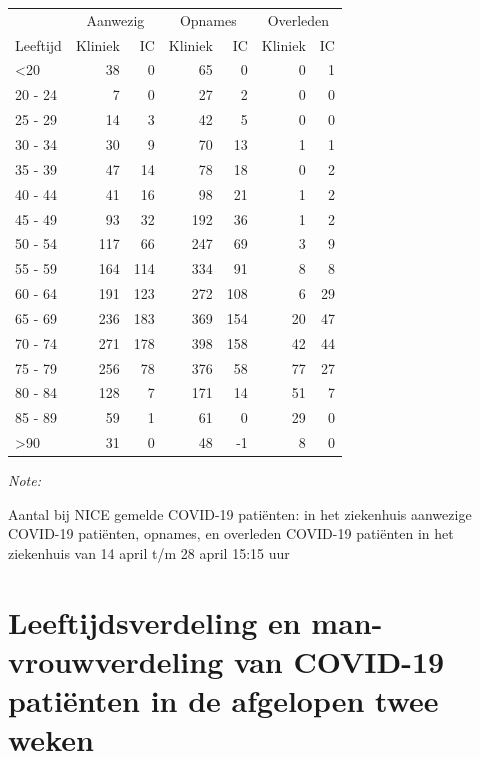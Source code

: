 \documentclass[
  english,
  man,floatsintext]{apa6}
\begin{document}
\begin{table}
\centering\begingroup\fontsize{10}{12}\selectfont

\begin{threeparttable}
\begin{tabular}{lrrrrrr}
\toprule
\multicolumn{1}{c}{ } & \multicolumn{2}{c}{Aanwezig} & \multicolumn{2}{c}{Opnames} & \multicolumn{2}{c}{Overleden} \\
\cmidrule(l{3pt}r{3pt}){2-3} \cmidrule(l{3pt}r{3pt}){4-5} \cmidrule(l{3pt}r{3pt}){6-7}
Leeftijd & Kliniek & IC & Kliniek & IC & Kliniek & IC\\
\midrule
<20 & 38 & 0 & 65 & 0 & 0 & 1\\
20 - 24 & 7 & 0 & 27 & 2 & 0 & 0\\
25 - 29 & 14 & 3 & 42 & 5 & 0 & 0\\
30 - 34 & 30 & 9 & 70 & 13 & 1 & 1\\
35 - 39 & 47 & 14 & 78 & 18 & 0 & 2\\
40 - 44 & 41 & 16 & 98 & 21 & 1 & 2\\
45 - 49 & 93 & 32 & 192 & 36 & 1 & 2\\
50 - 54 & 117 & 66 & 247 & 69 & 3 & 9\\
55 - 59 & 164 & 114 & 334 & 91 & 8 & 8\\
60 - 64 & 191 & 123 & 272 & 108 & 6 & 29\\
65 - 69 & 236 & 183 & 369 & 154 & 20 & 47\\
70 - 74 & 271 & 178 & 398 & 158 & 42 & 44\\
75 - 79 & 256 & 78 & 376 & 58 & 77 & 27\\
80 - 84 & 128 & 7 & 171 & 14 & 51 & 7\\
85 - 89 & 59 & 1 & 61 & 0 & 29 & 0\\
>90 & 31 & 0 & 48 & -1 & 8 & 0\\
\bottomrule
\end{tabular}
\begin{tablenotes}
\item \textit{Note: } 
\item Aantal bij NICE gemelde COVID-19 patiënten: in het ziekenhuis aanwezige COVID-19 patiënten, opnames, en overleden COVID-19 patiënten in het ziekenhuis van 14 april t/m 28 april 15:15 uur
\end{tablenotes}
\end{threeparttable}
\endgroup{}
\end{table}

\newpage

\hypertarget{leeftijdsverdeling-en-man-vrouwverdeling-van-covid-19-patiuxebnten-in-de-afgelopen-twee-weken}{%
\section{Leeftijdsverdeling en man-vrouwverdeling van COVID-19 patiënten in de afgelopen twee weken}\label{leeftijdsverdeling-en-man-vrouwverdeling-van-covid-19-patiuxebnten-in-de-afgelopen-twee-weken}}
\end{document}
